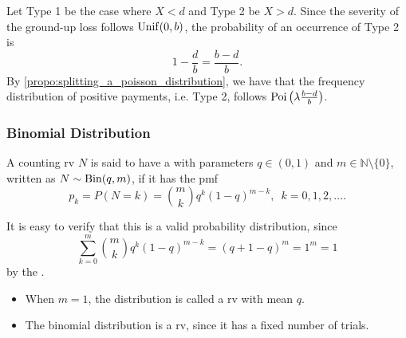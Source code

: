 \documentclass[notoc,notitlepage]{tufte-book}
\begin{document}
\begin{solution}
  Let Type 1 be the case where $X < d$ and Type 2 be $X > d$. Since the severity of the ground-up loss follows $\operatorname{Unif}(0, b)$, the probability of an occurrence of Type 2 is
  \begin{equation*}
    1 - \frac{d}{b} = \frac{b - d}{b}.
  \end{equation*}
  By \cref{propo:splitting_a_poisson_distribution}, we have that the frequency distribution of positive payments, i.e. Type 2, follows $\operatorname{Poi} \left( \lambda \frac{b - d}{b} \right)$.
\end{solution}


\subsubsection{Binomial Distribution}%
\label{ssub:binomial_distribution}

\begin{defn}\label{defn:binomial_distribution}
  A counting rv $N$ is said to have a  with parameters $q \in (0, 1)$ and $m \in \mathbb{N} \setminus \{ 0 \}$, written as $N \sim \operatorname{Bin}(q, m)$, if it has the pmf
  \begin{equation*}
    p_k = P(N = k) = \binom{m}{k} q^k ( 1 - q )^{m - k}, \enspace k = 0, 1, 2, \ldots .
  \end{equation*}
\end{defn}

\begin{remark}
  It is easy to verify that this is a valid probability distribution, since
  \begin{equation*}
    \sum_{k=0}^{m} \binom{m}{k} q^k (1 - q)^{m - k} = (q + 1 - q)^m = 1^m = 1
  \end{equation*}
  by the .
\end{remark}

\begin{note}
  \begin{itemize}
    \item When $m = 1$, the distribution is called a  rv with mean $q$. 
    \item The binomial distribution is a  rv, since it has a fixed number of trials.
  \end{itemize}
\end{note}
\end{document}
